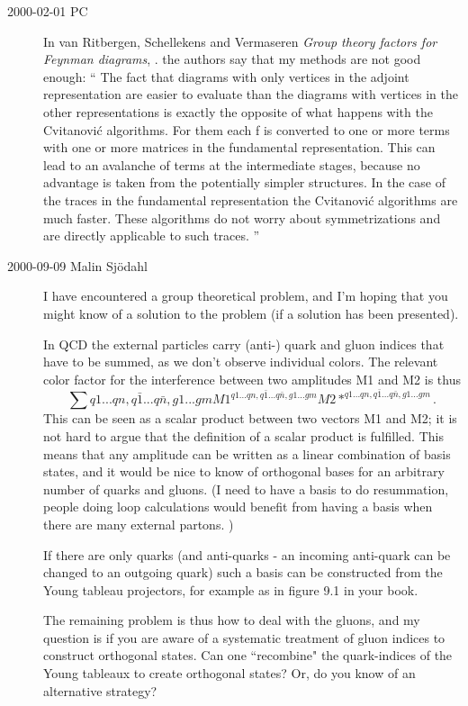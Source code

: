 \begin{description}

\item[2000-02-01 PC]
In van Ritbergen, Schellekens and Vermaseren
{\em Group theory factors for {Feynman} diagrams},
.
the authors say that my methods are not good enough: ``
The fact that diagrams with only vertices in the adjoint representation
are easier to evaluate than the diagrams with vertices in the other
representations is exactly the opposite of what happens with the
Cvitanovi{\'c} algorithms. For them each f is converted to
one or more terms with one or more matrices in the fundamental
representation. This can lead to an avalanche of terms at the
intermediate stages, because no advantage is taken from the potentially
simpler structures. In the case of the traces in the fundamental
representation the Cvitanovi{\'c} algorithms are much faster. These
algorithms do not worry about symmetrizations and are directly applicable
to such traces.
''

\item[2000-09-09 Malin Sj{\"o}dahl]
I have encountered a group theoretical problem, and I'm hoping that you might
know of a solution to the problem (if a solution has been presented).

In QCD the external particles carry (anti-) quark and gluon indices that have
to be summed, as we don't observe individual colors. The relevant color
factor for the interference between two amplitudes M1 and M2 is thus
\[
\sum{q1...qn, q\bar{1}...q\bar{n},g1...gm}
      M1^{q1...qn, q\bar{1}...q\bar{n},g1...gm}
      M2*^{q1...qn, q\bar{1}...q\bar{n},g1...gm}.
\]
This can be seen as a scalar product between two vectors M1 and M2; it is not
hard to argue that the definition of a scalar product is fulfilled. This
means that any amplitude can be written as a linear combination of basis
states, and it would be nice to know of orthogonal bases for an arbitrary
number of quarks and gluons. (I need to have a basis to do resummation,
people doing loop calculations would benefit from having a basis when there
are many external partons. )

If there are only quarks (and anti-quarks - an incoming anti-quark can be
changed to an outgoing quark) such a basis can be constructed from the Young
tableau projectors, for example as in figure 9.1 in your book.

The remaining problem is thus how to deal with the gluons, and my question is
if you are aware of a systematic treatment of gluon indices to construct
orthogonal states. Can one ``recombine" the quark-indices of the Young
tableaux to create orthogonal states? Or, do you know of an alternative
strategy?


\end{description}
